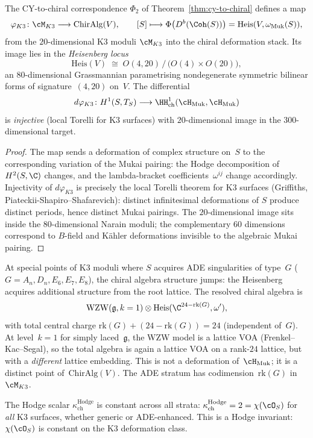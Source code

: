 \begin{proposition}
\label{prop:k3-moduli-map}
The CY-to-chiral correspondence $\Phi_2$ of Theorem~\textup{\ref{thm:cy-to-chiral}} defines a map
\[
 \varphi_{K3} \colon \cM_{K3} \longrightarrow \mathrm{ChirAlg}(V), \qquad [S] \longmapsto \Phi\bigl(D^b(\Coh(S))\bigr) = \mathrm{Heis}(V, \omega_{\mathrm{Muk}}(S)),
\]
from the $20$-dimensional K3 moduli $\cM_{K3}$ into the chiral deformation stack. Its image lies in the \emph{Heisenberg locus}
\[
 \mathrm{Heis}(V) \;\cong\; O(4, 20) \,/\, \bigl(O(4) \times O(20)\bigr),
\]
an $80$-dimensional Grassmannian parametrising nondegenerate symmetric bilinear forms of signature~$(4, 20)$ on~$V$. The differential
\[
 d\varphi_{K3} \colon H^1(S, T_S) \longrightarrow \HH^1_{\mathrm{ch}}(\cH_{\mathrm{Muk}}, \cH_{\mathrm{Muk}})
\]
is \emph{injective} (local Torelli for K3 surfaces) with $20$-dimensional image in the $300$-dimensional target.
\end{proposition}

\begin{proof}
The map sends a deformation of complex structure on~$S$ to the corresponding variation of the Mukai pairing: the Hodge decomposition of $H^2(S, \C)$ changes, and the lambda-bracket coefficients~$\omega^{ij}$ change accordingly. Injectivity of $d\varphi_{K3}$ is precisely the local Torelli theorem for K3 surfaces (Griffiths, Piateckii-Shapiro--Shafarevich): distinct infinitesimal deformations of $S$ produce distinct periods, hence distinct Mukai pairings. The $20$-dimensional image sits inside the $80$-dimensional Narain moduli; the complementary $60$ dimensions correspond to $B$-field and K\"ahler deformations invisible to the algebraic Mukai pairing.
\end{proof}

\begin{remark}
\label{rem:ade-stratification}
At special points of K3 moduli where $S$ acquires ADE singularities of type~$G$ ($G = A_n, D_n, E_6, E_7, E_8$), the chiral algebra structure jumps: the Heisenberg acquires additional structure from the root lattice. The resolved chiral algebra is
\[
 \mathrm{WZW}(\mathfrak{g}, k=1) \otimes \mathrm{Heis}(\C^{24 - \mathrm{rk}(G)}, \omega'),
\]
with total central charge $\mathrm{rk}(G) + (24 - \mathrm{rk}(G)) = 24$ (independent of~$G$). At level~$k = 1$ for simply laced~$\mathfrak{g}$, the WZW model is a lattice VOA (Frenkel--Kac--Segal), so the total algebra is again a lattice VOA on a rank-$24$ lattice, but with a \emph{different} lattice embedding. This is not a deformation of~$\cH_{\mathrm{Muk}}$; it is a distinct point of~$\mathrm{ChirAlg}(V)$. The ADE stratum has codimension~$\mathrm{rk}(G)$ in~$\cM_{K3}$.

The Hodge scalar $\kappa_{\mathrm{ch}}^{\mathrm{Hodge}}$ is constant across all strata: $\kappa_{\mathrm{ch}}^{\mathrm{Hodge}} = 2 = \chi(\cO_S)$ for \emph{all} K3 surfaces, whether generic or ADE-enhanced. This is a Hodge invariant: $\chi(\cO_S)$ is constant on the K3 deformation class.
\end{remark}

